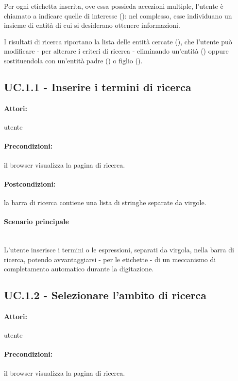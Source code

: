 \documentclass[10pt,a4paper,headinclude,footinclude,hidelinks]{scrreprt} %
\begin{document}
	Per ogni etichetta inserita, ove essa possieda accezioni multiple, l'utente è chiamato a indicare quelle di interesse (): nel complesso, esse individuano un insieme di entità di cui si desiderano ottenere informazioni.

	I risultati di ricerca riportano la lista delle entità cercate (), che l'utente può modificare - per alterare i criteri di ricerca - eliminando un'entità () oppure sostituendola con un'entità padre () o figlio ().

 	\subsection[UC.1.1]{UC.1.1 - Inserire i termini di ricerca}
	\label{sec:stage:ar:uc:1_1}
	\paragraph{Attori:}  utente
	\paragraph{Precondizioni:} il browser visualizza la pagina di ricerca.
	\paragraph{Postcondizioni:} la barra di ricerca contiene una lista di stringhe separate da virgole.
	\paragraph{Scenario principale} \hfill \\
	L'utente inserisce i termini o le espressioni, separati da virgola, nella barra di ricerca, potendo avvantaggiarsi - per le etichette - di un meccanismo di completamento automatico durante la digitazione.

	\subsection[UC.1.2]{UC.1.2 - Selezionare l'ambito di ricerca}
	\label{sec:stage:ar:uc:1_2}
	\paragraph{Attori:} utente
	\paragraph{Precondizioni:} il browser visualizza la pagina di ricerca.
\end{document}
